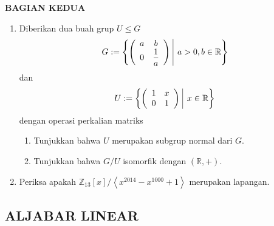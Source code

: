 \documentclass[12pt,twoside]{article}
\begin{document}
\newpage \textbf{BAGIAN KEDUA}
\begin{enumerate}
	\item Diberikan dua buah grup $U \leq G$
	      \begin{equation*}
		      G := \left\lbrace \left( \begin{array}{cc}
				      a & b \\ 0& \dfrac{1}{a}
			      \end{array} \right) ~ \vline ~ a>0, b\in \mathbb{R} \right\rbrace
	      \end{equation*}
	      dan
	      \begin{equation*}
		      U := \left\lbrace \left( \begin{array}{cc}
				      1 & x \\ 0&1
			      \end{array} \right) ~ \vline ~ x\in \mathbb{R} \right\rbrace
	      \end{equation*}
	      dengan operasi perkalian matriks
	      \begin{enumerate}
		      \item Tunjukkan bahwa $U$ merupakan subgrup normal dari $G$.
		      \item Tunjukkan bahwa $G/U$ isomorfik dengan $(\mathbb{R},+)$.
	      \end{enumerate}

	\item Periksa apakah $\mathbb{Z}_{13}[x]/\left< x^{2014}-x^{1000}+1\right>$ merupakan lapangan.
\end{enumerate}
\pagebreak
\subsection{ALJABAR LINEAR}
\end{document}
